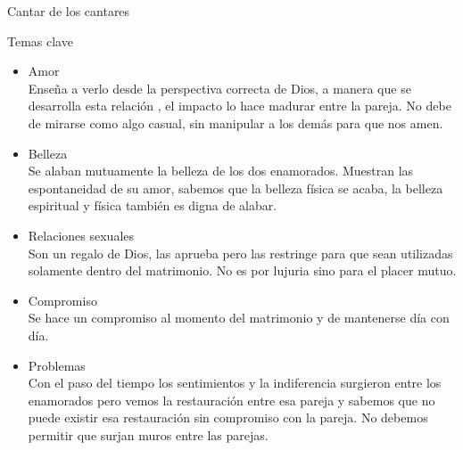 \begin{section}{Cantar de los cantares}
\begin{subsection}{Temas clave}
\begin{itemize}
			\item Amor\\
				Enseña a verlo desde la perspectiva correcta de Dios, a manera que se desarrolla esta relación , el impacto lo hace madurar entre la pareja. No debe de mirarse como algo casual, sin manipular a los demás para que nos amen.
			\item Belleza\\
				Se alaban mutuamente la belleza de los dos enamorados. Muestran las espontaneidad de su amor, sabemos que la belleza física se acaba, la belleza espiritual y física también es digna de alabar. 
			\item Relaciones sexuales\\
				Son un regalo de Dios, las aprueba pero las restringe para que sean utilizadas solamente dentro del matrimonio. No es por lujuria sino para el placer mutuo.
			\item Compromiso\\
				Se hace un compromiso al momento del matrimonio y de mantenerse día con día. 
			\item Problemas\\
				Con el paso del tiempo los sentimientos y la indiferencia surgieron entre los enamorados pero vemos la restauración entre esa pareja y sabemos que no puede existir esa restauración sin compromiso con la pareja. No debemos permitir que surjan muros entre las parejas.
		\end{itemize}
	\end{subsection}
\end{section}
%


